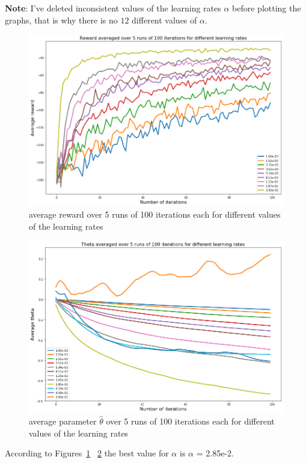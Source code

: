 \documentclass[11pt]{article}
\numberwithin{figure}{section} %
\begin{document}
\textbf{Note}: I've deleted inconsistent values of the learning rates $\alpha$ before plotting the graphs, that is why there is no $12$ different values of $\alpha$.

\begin{figure}[H]
		\centering
		\includegraphics[width=0.9\linewidth]{images/adam_avg_reward}
		\caption{average reward over 5 runs of 100 iterations each for different values of the learning rates}
		\label{fig:adam_avg_reward}
\end{figure}

\begin{figure}[H]
		\centering
		\includegraphics[width=0.9\linewidth]{images/adam_avg_theta_consistent}
		\caption{average parameter $\widehat{\theta}$ over 5 runs of 100 iterations each for different values of the learning rates}
		\label{fig:adam_mean_param}
\end{figure}

According to Figures~\ref{fig:adam_avg_reward} ~\ref{fig:adam_mean_param} the best value for $\alpha$ is $\alpha$ = 2.85e-2.
\end{document}
